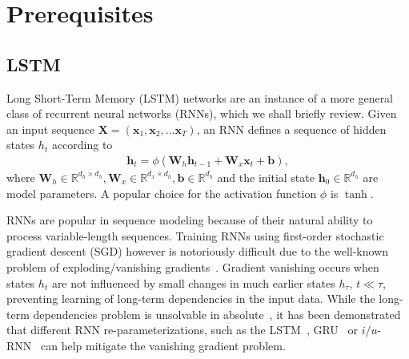 \documentclass{article} %
\newcommand{\vect}[1]{\mathbf{#1}}
\newcommand{\mat}[1]{\mathbf{#1}}
\newcommand{\reals}{\mathbb{R}}
\begin{document}
\section{Prerequisites}
\label{sec:prerequisites}


\subsection{LSTM}

Long Short-Term Memory (LSTM) networks are an instance of a more general class of recurrent neural networks (RNNs),
which we shall briefly review.
Given an input sequence
$\mat{X} = ( \vect{x}_1, \vect{x}_2, ... \vect{x}_T )$,
an RNN defines a sequence of hidden states $h_t$ according to
\begin{eqnarray}
  \mat{h}_t = \phi(\mat{W}_h \vect{h}_{t-1} + \mat{W}_x  \vect{x}_t + \vect{b}),
\end{eqnarray}
where $\mat{W}_h \in \reals^{d_h \times d_h}, \mat{W}_x \in \reals^{d_x \times d_h}, \vect{b} \in \reals^{d_h}$
and the initial state $\vect{h}_0 \in \reals^{d_h}$ %
are model parameters.
A popular choice for the activation function $\phi$ is $\tanh$.

RNNs are popular in sequence modeling because of their natural ability to process variable-length sequences.
Training RNNs using first-order stochastic gradient descent (SGD) however is notoriously difficult
due to the well-known problem of exploding/vanishing gradients~\cite{bengio1994learning,hochreiter1991untersuchungen,pascanudifficulty}.
Gradient vanishing occurs when states $h_t$ are not influenced by small changes in much earlier states $h_{\tau}$, $t \ll \tau$,
preventing learning of long-term dependencies in the input data.
While the long-term dependencies problem is unsolvable in absolute~\cite{bengio1994learning},
it has been demonstrated that different RNN re-parameterizations, such as the LSTM~\cite{lstm}, GRU~\cite{cho2014learning} or $i$/$u$-RNN~\cite{le2015simple,urnn}
can help mitigate the vanishing gradient problem.
\end{document}
